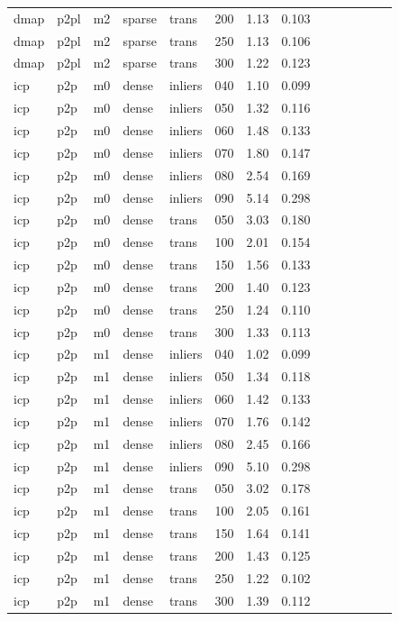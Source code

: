 \begin{table}[htbp]
\begin{tabular}{llllllrrrrrrrr}
  dmap & p2pl & m2 & sparse & trans & 200 & 1.13 & 0.103 \\
  dmap & p2pl & m2 & sparse & trans & 250 & 1.13 & 0.106 \\
  dmap & p2pl & m2 & sparse & trans & 300 & 1.22 & 0.123 \\
  icp & p2p & m0 & dense & inliers & 040 & 1.10 & 0.099 \\
  icp & p2p & m0 & dense & inliers & 050 & 1.32 & 0.116 \\
  icp & p2p & m0 & dense & inliers & 060 & 1.48 & 0.133 \\
  icp & p2p & m0 & dense & inliers & 070 & 1.80 & 0.147 \\
  icp & p2p & m0 & dense & inliers & 080 & 2.54 & 0.169 \\
  icp & p2p & m0 & dense & inliers & 090 & 5.14 & 0.298 \\
  icp & p2p & m0 & dense & trans & 050 & 3.03 & 0.180 \\
  icp & p2p & m0 & dense & trans & 100 & 2.01 & 0.154 \\
  icp & p2p & m0 & dense & trans & 150 & 1.56 & 0.133 \\
  icp & p2p & m0 & dense & trans & 200 & 1.40 & 0.123 \\
  icp & p2p & m0 & dense & trans & 250 & 1.24 & 0.110 \\
  icp & p2p & m0 & dense & trans & 300 & 1.33 & 0.113 \\
  icp & p2p & m1 & dense & inliers & 040 & 1.02 & 0.099 \\
  icp & p2p & m1 & dense & inliers & 050 & 1.34 & 0.118 \\
  icp & p2p & m1 & dense & inliers & 060 & 1.42 & 0.133 \\
  icp & p2p & m1 & dense & inliers & 070 & 1.76 & 0.142 \\
  icp & p2p & m1 & dense & inliers & 080 & 2.45 & 0.166 \\
  icp & p2p & m1 & dense & inliers & 090 & 5.10 & 0.298 \\
  icp & p2p & m1 & dense & trans & 050 & 3.02 & 0.178 \\
  icp & p2p & m1 & dense & trans & 100 & 2.05 & 0.161 \\
  icp & p2p & m1 & dense & trans & 150 & 1.64 & 0.141 \\
  icp & p2p & m1 & dense & trans & 200 & 1.43 & 0.125 \\
  icp & p2p & m1 & dense & trans & 250 & 1.22 & 0.102 \\
  icp & p2p & m1 & dense & trans & 300 & 1.39 & 0.112 \\

\end{tabular}
\end{table}
